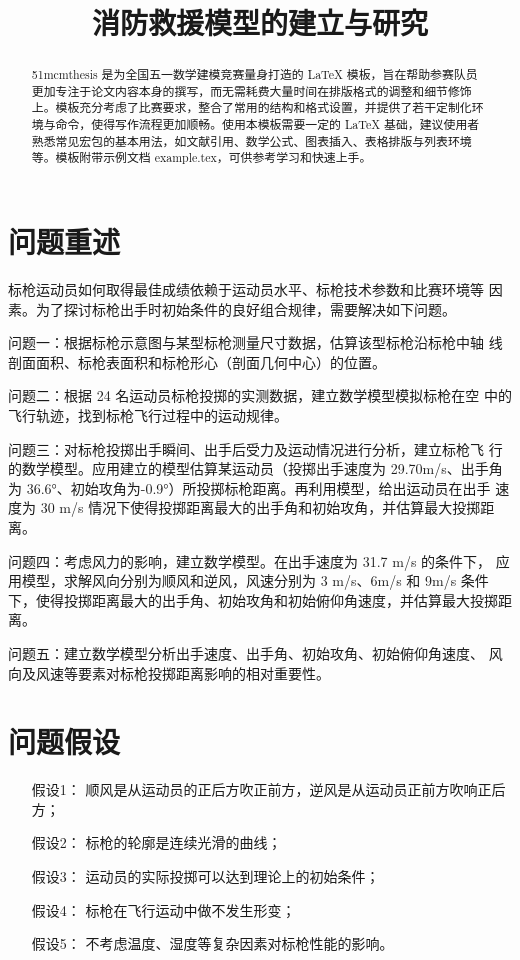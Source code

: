 \documentclass{51mcmthesis}
\title{消防救援模型的建立与研究}
\begin{document}
\maketitle
{}
\begin{abstract}
    51mcmthesis 是为全国五一数学建模竞赛量身打造的 \LaTeX{} 模板，旨在帮助参赛队员更加专注于论文内容本身的撰写，而无需耗费大量时间在排版格式的调整和细节修饰上。模板充分考虑了比赛要求，整合了常用的结构和格式设置，并提供了若干定制化环境与命令，使得写作流程更加顺畅。使用本模板需要一定的 \LaTeX{} 基础，建议使用者熟悉常见宏包的基本用法，如文献引用、数学公式、图表插入、表格排版与列表环境等。模板附带示例文档 example.tex，可供参考学习和快速上手。


\end{abstract}
\section{问题重述}
标枪运动员如何取得最佳成绩依赖于运动员水平、标枪技术参数和比赛环境等
因素。为了探讨标枪出手时初始条件的良好组合规律，需要解决如下问题。

问题一：根据标枪示意图与某型标枪测量尺寸数据，估算该型标枪沿标枪中轴
线剖面面积、标枪表面积和标枪形心（剖面几何中心）的位置。

问题二：根据 24 名运动员标枪投掷的实测数据，建立数学模型模拟标枪在空
中的飞行轨迹，找到标枪飞行过程中的运动规律。

问题三：对标枪投掷出手瞬间、出手后受力及运动情况进行分析，建立标枪飞
行的数学模型。应用建立的模型估算某运动员（投掷出手速度为 29.70m/s、出手角
为 36.6°、初始攻角为-0.9°）所投掷标枪距离。再利用模型，给出运动员在出手
速度为 30 m/s 情况下使得投掷距离最大的出手角和初始攻角，并估算最大投掷距
离。

问题四：考虑风力的影响，建立数学模型。在出手速度为 31.7 m/s 的条件下，
应用模型，求解风向分别为顺风和逆风，风速分别为 3 m/s、6m/s 和 9m/s 条件
下，使得投掷距离最大的出手角、初始攻角和初始俯仰角速度，并估算最大投掷距
离。

问题五：建立数学模型分析出手速度、出手角、初始攻角、初始俯仰角速度、
风向及风速等要素对标枪投掷距离影响的相对重要性。
\section{问题假设}
\noindent\begin{enumerate}
    \item[假设1：] 顺风是从运动员的正后方吹正前方，逆风是从运动员正前方吹响正后方；
    \item[假设2：] 标枪的轮廓是连续光滑的曲线；
    \item[假设3：] 运动员的实际投掷可以达到理论上的初始条件；
    \item[假设4：] 标枪在飞行运动中做不发生形变；
    \item[假设5：] 不考虑温度、湿度等复杂因素对标枪性能的影响。
\end{enumerate}
\end{document}
